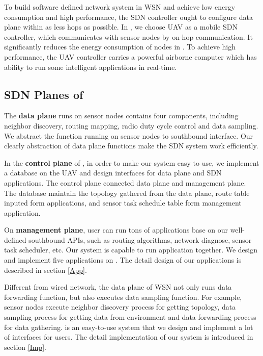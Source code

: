 To build software defined network system in WSN and achieve low 
energy consumption and high performance, the SDN controller ought to  
configure data plane within as less hops as possible.  
In {\sdn}, we choose UAV as a mobile SDN controller,  
which communicates with sensor nodes by on-hop communication.
It significantly reduces the energy consumption of nodes in {\sdn}. 
To achieve high performance, the UAV controller carries
a powerful airborne computer which has ability to run 
some intelligent applications in real-time.

\subsection{SDN Planes of {\sdn}}
The \textbf{data plane} runs on sensor nodes contains four components, including neighbor discovery, routing mapping, radio duty cycle control and data sampling. We abstract the function running on sensor nodes to southbound interface. Our clearly abstraction of data plane functions make the SDN system work efficiently.

In the \textbf{control plane} of {\sdn}, in order to make our system easy to use, we implement a database on the UAV and design interfaces for data plane and SDN applications. The control plane connected data plane and management plane. The database maintain the topology gathered from the data plane, route table inputed form applications, and sensor task schedule table form management application.

On \textbf{management plane}, user can run tons of applications base on our well-defined southbound APIs, such as routing algorithms, network diagnose, sensor task 
scheduler, etc. Our system is capable to run application together. We design and implement five applications on {\sdn}. The detail design of our applications is described in section \ref{App}. 

Different from wired network, the data plane of WSN not only runs
data forwarding function, but also executes data sampling function. 
For example,  sensor nodes execute neighbor discovery process for getting topology, 
data sampling process for getting data from environment and data forwarding process
for data gathering. {\sdn} is an easy-to-use system that we design and implement a lot of 
interfaces for users. The detail implementation of our system is introduced in section \ref{Imp}.
